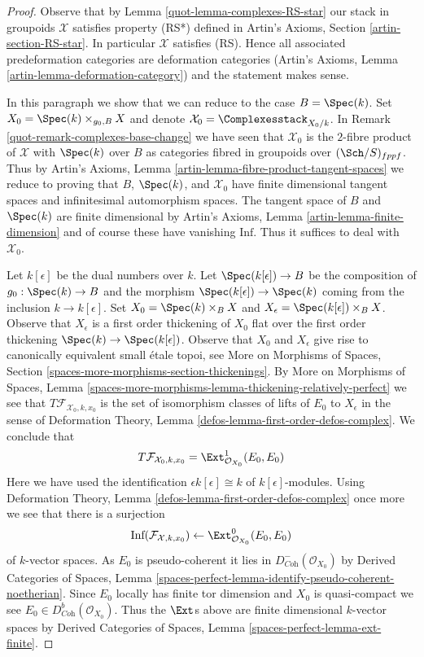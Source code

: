 \begin{proof}

Observe that by Lemma \ref{quot-lemma-complexes-RS-star}
our stack in groupoids $\mathcal{X}$ satisfies property (RS*)
defined in Artin's Axioms, Section \ref{artin-section-RS-star}.
In particular $\mathcal{X}$ satisfies (RS).
Hence all associated predeformation
categories are deformation categories
(Artin's Axioms, Lemma \ref{artin-lemma-deformation-category})
and the statement makes sense.

\medskip\noindent
In this paragraph we show that we can reduce to the case $B = \Spec(k)$.
Set $X_0 = \Spec(k) \times_{g_0, B} X$
and denote $\mathcal{X}_0 = \Complexesstack_{X_0/k}$. In
Remark \ref{quot-remark-complexes-base-change} we have seen that
$\mathcal{X}_0$ is the $2$-fibre product of $\mathcal{X}$ with
$\Spec(k)$ over $B$ as categories fibred in groupoids over
$(\Sch/S)_{fppf}$. Thus by
Artin's Axioms, Lemma \ref{artin-lemma-fibre-product-tangent-spaces}
we reduce to proving that $B$, $\Spec(k)$, and $\mathcal{X}_0$
have finite dimensional tangent spaces and infinitesimal automorphism
spaces. The tangent space of $B$ and $\Spec(k)$ are finite dimensional by
Artin's Axioms, Lemma \ref{artin-lemma-finite-dimension}
and of course these have vanishing $\text{Inf}$.
Thus it suffices to deal with $\mathcal{X}_0$.

\medskip\noindent
Let $k[\epsilon]$ be the dual numbers over $k$.
Let $\Spec(k[\epsilon]) \to B$ be the composition of $g_0 : \Spec(k) \to B$
and the morphism $\Spec(k[\epsilon]) \to \Spec(k)$
coming from the inclusion $k \to k[\epsilon]$.
Set $X_0 = \Spec(k) \times_B X$ and
$X_\epsilon = \Spec(k[\epsilon]) \times_B X$.
Observe that $X_\epsilon$ is a first order thickening of $X_0$
flat over the first order thickening $\Spec(k) \to \Spec(k[\epsilon])$.
Observe that $X_0$ and $X_\epsilon$ give rise to canonically equivalent
small \'etale topoi, see
More on Morphisms of Spaces, Section
\ref{spaces-more-morphisms-section-thickenings}.
By More on Morphisms of Spaces, Lemma
\ref{spaces-more-morphisms-lemma-thickening-relatively-perfect}
we see that $T\mathcal{F}_{\mathcal{X}_0, k, x_0}$ is the set of
isomorphism classes of lifts of $E_0$ to $X_\epsilon$ in the sense of
Deformation Theory, Lemma \ref{defos-lemma-first-order-defos-complex}.
We conclude that
$$
T\mathcal{F}_{\mathcal{X}_0, k, x_0} =
\Ext^1_{\mathcal{O}_{X_0}}(E_0, E_0)
$$
Here we have used the identification $\epsilon k[\epsilon] \cong k$
of $k[\epsilon]$-modules. Using
Deformation Theory, Lemma \ref{defos-lemma-first-order-defos-complex}
once more we see that there is a surjection
$$
\text{Inf}(\mathcal{F}_{\mathcal{X}, k, x_0})
\leftarrow
\Ext^0_{\mathcal{O}_{X_0}}(E_0, E_0)
$$
of $k$-vector spaces. As $E_0$ is pseudo-coherent it lies in
$D^-_{\textit{Coh}}(\mathcal{O}_{X_0})$ by
Derived Categories of Spaces, Lemma
\ref{spaces-perfect-lemma-identify-pseudo-coherent-noetherian}.
Since $E_0$ locally has finite tor dimension and $X_0$
is quasi-compact we see $E_0 \in D^b_{\textit{Coh}}(\mathcal{O}_{X_0})$.
Thus the $\Ext$s above are finite dimensional $k$-vector spaces
by Derived Categories of Spaces, Lemma
\ref{spaces-perfect-lemma-ext-finite}.
\end{proof}
